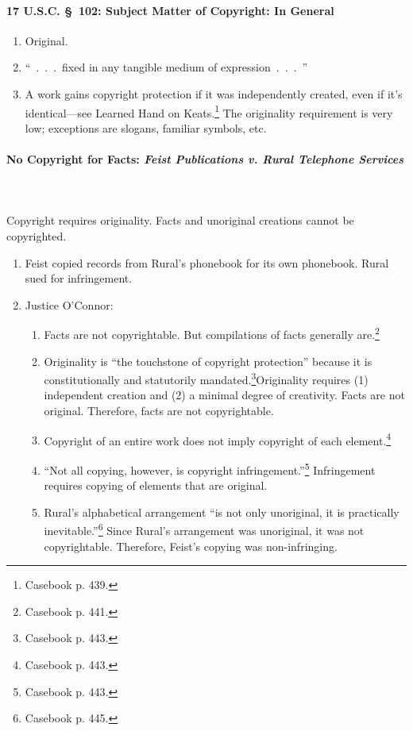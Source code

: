\paragraph{17 U.S.C. \S\ 102: Subject Matter of Copyright: In General}

\begin{enumerate}
    \item Original.
    \item ``~.~.~.~fixed in any tangible medium of expression~.~.~.~''
    \item A work gains copyright protection if it was independently created, 
    even if it's identical---see Learned Hand on Keats.\footnote{Casebook p. 
    439.} The originality requirement is very low; exceptions are slogans, 
    familiar symbols, etc.
\end{enumerate}

\paragraph{No Copyright for Facts: \emph{Feist Publications v. Rural Telephone 
Services}}
~\\\\Copyright requires originality. Facts and unoriginal creations cannot be 
copyrighted.

\begin{enumerate}
    \item Feist copied records from Rural's phonebook for its own phonebook. 
    Rural sued for infringement.
    \item Justice O'Connor:
    \begin{enumerate}
        \item Facts are not copyrightable. But compilations of facts generally 
        are.\footnote{Casebook p. 441.}
        \item Originality is ``the touchstone of copyright 
        protection'' because it is constitutionally and statutorily 
        mandated.\footnote{Casebook p. 443.}Originality requires (1) 
        independent creation and (2) a minimal degree of creativity.  
        Facts are not original. Therefore, facts are not copyrightable.
        \item Copyright of an entire work does not imply copyright of each 
        element.\footnote{Casebook p. 443.}
        \item ``Not all copying, however, is copyright 
        infringement.''\footnote{Casebook p. 443.} Infringement requires 
        copying of elements that are original. 
        \item Rural's alphabetical arrangement ``is not only unoriginal, it is 
        practically inevitable.''\footnote{Casebook p. 445.} Since Rural's 
        arrangement was unoriginal, it was not copyrightable. Therefore, 
        Feist's copying was non-infringing.
    \end{enumerate}
\end{enumerate}

